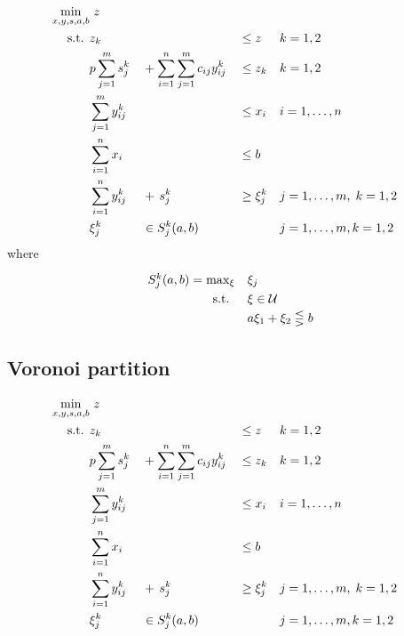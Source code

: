 \documentclass{article}
\newcommand{\uncset}{\mathcal{U}}
\newcommand{\uncparam}{\xi}
\newcommand{\snno}{n}
\newcommand{\sn}{i}
\newcommand{\dnno}{m}
\newcommand{\dn}{j}
\begin{document}
\begin{align}
\arraycolsep=1.3pt\def\arraystretch{1.3}
 \displaystyle \min_{x,y,s,a,b}& \omit\rlap{ $z$}  \\
\textrm{s.t. } 	& z_k && &&\leq z && k=1,2 \\
                & p\sum\limits_{\dn=1}^\dnno s_\dn^k &&+ \sum\limits_{\sn=1}^\snno\sum\limits_{\dn=1}^\dnno c_{\sn\dn}y_{\sn\dn}^k && \leq z_k &&k=1,2\\
				& \sum\limits_{\dn=1}^\dnno y_{\sn\dn}^k && 	&& \leq x_\sn 	&&\sn=1,\dots,\snno \\
                & \sum\limits_{\sn=1}^\snno x_\sn &&	&& \leq b \\
                & \sum\limits_{\sn=1}^\snno y_{\sn\dn}^k &&+\, s_\dn^k &&\geq  \uncparam_\dn^k && \dn=1,\dots,\dnno,\; k=1,2 \\
                &\uncparam_j^k && \in S_j^k(a,b) && && \dn=1,\dots,\dnno, k=1,2
\end{align}
where
\begin{equation}
    \begin{array}{rl}
        S_j^k(a,b) = \max_\uncparam & \multicolumn{1}{l}{\uncparam_j} \\
        \text{s.t. } & \uncparam \in\uncset \\
                & a\uncparam_1 + \uncparam_2 \lesseqgtr b
    \end{array} 
\end{equation}

\subsection{Voronoi partition}

\begin{align}
\arraycolsep=1.3pt\def\arraystretch{1.3}
 \displaystyle \min_{x,y,s,a,b}& \omit\rlap{ $z$}  \\
\textrm{s.t. } 	& z_k && &&\leq z && k=1,2 \\
                & p\sum\limits_{\dn=1}^\dnno s_\dn^k &&+ \sum\limits_{\sn=1}^\snno\sum\limits_{\dn=1}^\dnno c_{\sn\dn}y_{\sn\dn}^k && \leq z_k &&k=1,2\\
				& \sum\limits_{\dn=1}^\dnno y_{\sn\dn}^k && 	&& \leq x_\sn 	&&\sn=1,\dots,\snno \\
                & \sum\limits_{\sn=1}^\snno x_\sn &&	&& \leq b && \\
                & \sum\limits_{\sn=1}^\snno y_{\sn\dn}^k &&+\, s_\dn^k &&\geq  \uncparam_\dn^k && \dn=1,\dots,\dnno,\; k=1,2 \\
                &\uncparam_j^k && \in S_j^k(a,b) && && \dn=1,\dots,\dnno, k=1,2
\end{align}
\end{document}
